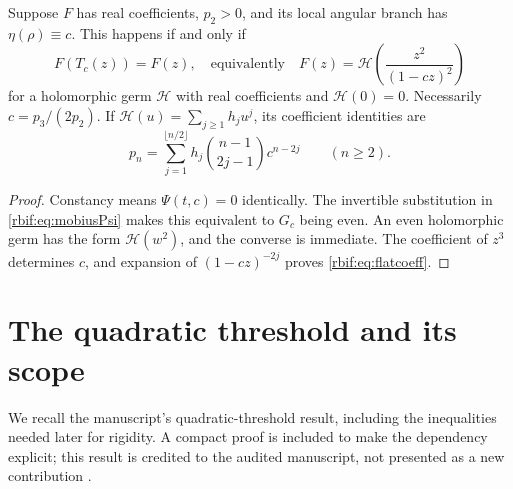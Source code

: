 \begin{corollary}
\label{rbif:cor:flatstructure}
Suppose $F$ has real coefficients, $p_2>0$, and its local angular branch
has $\eta(\rho)\equiv c$. This happens if and only if
\begin{equation}
 F(T_c(z))=F(z),
 \quad\text{equivalently}\quad
 F(z)=\mathcal H\!\left(\frac{z^2}{(1-cz)^2}\right)
 \label{rbif:eq:flatstructure}
\end{equation}
for a holomorphic germ $\mathcal H$ with real coefficients and
$\mathcal H(0)=0$. Necessarily $c=p_3/(2p_2)$.
If $\mathcal H(u)=\sum_{j\ge1}h_ju^j$, its coefficient identities are
\begin{equation}
 p_n=\sum_{j=1}^{\lfloor n/2\rfloor}
           h_j\binom{n-1}{2j-1}c^{n-2j}\qquad(n\ge2).
 \label{rbif:eq:flatcoeff}
\end{equation}
\end{corollary}
\begin{proof}
Constancy means $\Psi(t,c)=0$ identically. The invertible substitution in
\eqref{rbif:eq:mobiusPsi} makes this equivalent to $G_c$ being even.
An even holomorphic germ has the form $\mathcal H(w^2)$, and the converse
is immediate. The coefficient of $z^3$ determines $c$, and expansion of
$(1-cz)^{-2j}$ proves \eqref{rbif:eq:flatcoeff}.
\end{proof}

\section{The quadratic threshold and its scope}
\label{rbif:sec:quadratic}
We recall the manuscript's quadratic-threshold result, including the
inequalities needed later for rigidity. A compact proof is included to
make the dependency explicit; this result is credited to the audited
manuscript, not presented as a new contribution \cite{rbif:local}.

